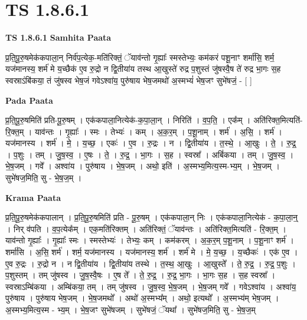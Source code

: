 \documentclass[17pt]{extarticle}
\begin{document}
\section{ TS 1.8.6.1 }

\textbf{TS 1.8.6.1 } \newline
\textbf{Samhita Paata} \newline

प्र॒ति॒पू॒रु॒षमेक॑कपाला॒न् निर्व॑प॒त्येक॒-मति॑रिक्तं॒ ॅयाव॑न्तो गृ॒ह्याः᳚ स्मस्तेभ्यः॒ कम॑करं पशू॒नाꣳ शर्मा॑सि॒ शर्म॒ यज॑मानस्य॒ शर्म॑ मे य॒च्छैक॑ ए॒व रु॒द्रो न द्वि॒तीया॑य तस्थ आ॒खुस्ते॑ रुद्र प॒शुस्तं जु॑षस्वै॒ष ते॑ रुद्र भा॒गः स॒ह स्वस्राऽंबि॑कया॒ तं जु॑षस्व भेष॒जं गवेऽश्वा॑य॒ पुरु॑षाय भेष॒जमथो॑ अ॒स्मभ्यं॑ भेष॒जꣳ सुभे॑षजं॒ - [ ] \newline

\textbf{Pada Paata} \newline

प्र॒ति॒पू॒रु॒षमिति॑ प्रति-पू॒रु॒षम् । एक॑कपाला॒नित्येक॑-क॒पा॒ला॒न् । निरिति॑ । व॒प॒ति॒ । एक᳚म् । अति॑रिक्त॒मित्यति॑-रि॒क्त॒म् । याव॑न्तः । गृ॒ह्याः᳚ । स्मः । तेभ्यः॑ । कम् । अ॒क॒र॒म् । प॒शू॒नाम् । शर्म॑ । अ॒सि॒ । शर्म॑ । यज॑मानस्य । शर्म॑ । मे॒ । य॒च्छ॒ । एकः॑ । ए॒व । रु॒द्रः । न । द्वि॒तीया॑य । त॒स्थे॒ । आ॒खुः । ते॒ । रु॒द्र॒ । प॒शुः । तम् । जु॒ष॒स्व॒ । ए॒षः । ते॒ । रु॒द्र॒ । भा॒गः । स॒ह । स्वस्रा᳚ । अबिं॑कया । तम् । जु॒ष॒स्व॒ । भे॒ष॒जम् । गवे᳚ । अश्वा॑य । पुरु॑षाय । भे॒ष॒जम् । अथो॒ इति॑ । अ॒स्मभ्य॒मित्य॒स्म-भ्य॒म् । भे॒ष॒जम् । सुभे॑षज॒मिति॒ सु - भे॒ष॒ज॒म् ।  \newline


\textbf{Krama Paata} \newline

प्र॒ति॒पू॒रु॒षमेक॑कपालान् । प्र॒ति॒पू॒रु॒षमिति॑ प्रति - पू॒रु॒षम् । एक॑कपाला॒न् निः । एक॑कपाला॒नित्येक॑ - क॒पा॒ला॒न्॒ । निर् व॑पति । व॒प॒त्येक᳚म् । एक॒मति॑रिक्तम् । अति॑रिक्तं॒ ॅयाव॑न्तः । अति॑रिक्त॒मित्यति॑ - रि॒क्त॒म् । याव॑न्तो गृ॒ह्याः᳚ । गृ॒ह्याः᳚ स्मः । स्मस्तेभ्यः॑ । तेभ्यः॒ कम् । कम॑करम् । अ॒क॒र॒म् प॒शू॒नाम् । प॒शू॒नाꣳ शर्म॑ । शर्मा॑सि । अ॒सि॒ शर्म॑ । शर्म॒ यज॑मानस्य । यज॑मानस्य॒ शर्म॑ । शर्म॑ मे । मे॒ य॒च्छ॒ । य॒च्छैकः॑ । एक॑ ए॒व । ए॒व रु॒द्रः । रु॒द्रो न । न द्वि॒तीया॑य । द्वि॒तीया॑य तस्थे । त॒स्थ॒ आ॒खुः । आ॒खुस्ते᳚ । ते॒ रु॒द्र॒ । रु॒द्र॒ प॒शुः । प॒शुस्तम् । तम् जु॑षस्व । जु॒ष॒स्वै॒षः । ए॒ष ते᳚ । ते॒ रु॒द्र॒ । रु॒द्र॒ भा॒गः । भा॒गः स॒ह । स॒ह स्वस्रा᳚ । स्वस्राऽम्बि॑कया । अम्बि॑कया॒ तम् । तम् जु॑षस्व । जु॒ष॒स्व॒ भे॒ष॒जम् । भे॒ष॒जम् गवे᳚ । गवेऽश्वा॑य । अश्वा॑य॒ पुरु॑षाय । पुरु॑षाय भेष॒जम् । भे॒ष॒जमथो᳚ । अथो॑ अ॒स्मभ्य᳚म् । अथो॒ इत्यथो᳚ । अ॒स्मभ्य॑म् भेष॒जम् । अ॒स्मभ्य॒मित्य॒स्म - भ्य॒म् । भे॒ष॒जꣳ 
सुभे॑षजम् । सुभे॑षजं॒ ॅयथा᳚ । सुभे॑षज॒मिति॒ सु - भे॒ष॒ज॒म् \newline
\end{document}
